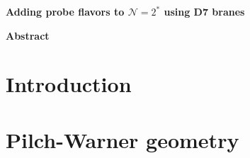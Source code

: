 \documentclass[11pt]{article}
\begin{document}
\thispagestyle{empty}
\begin{flushright}\footnotesize
\end{flushright}
\vspace{1cm}

\begin{center}%
{\Large\textbf{%
Adding probe flavors to $\mathcal{N}=2^*$ using D7 branes
}\par}

\vspace{1.5cm}
%





\par\vspace{14mm}

\textbf{Abstract} \vspace{5mm}

\begin{minipage}{14cm}


\end{minipage}

\end{center}





\newpage

\tableofcontents


\bigskip
\noindent\hrulefill
\bigskip


\section{Introduction}\label{sec:intro}


\section{Pilch-Warner geometry}\label{sec:PWB}
\end{document}

